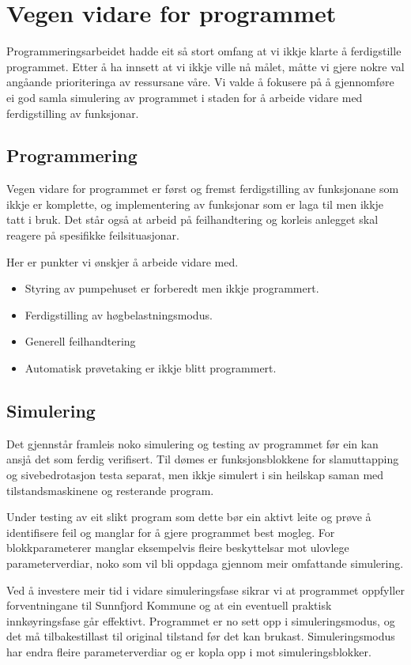 \section{Vegen vidare for programmet}
\thispagestyle{fancy}

Programmeringsarbeidet hadde eit så stort omfang at vi ikkje klarte å ferdigstille programmet.
Etter å ha innsett at vi ikkje ville nå målet, måtte vi gjere nokre val angåande prioriteringa av ressursane våre. 
Vi valde å fokusere på å gjennomføre ei god samla simulering av programmet i staden for å arbeide vidare med ferdigstilling av funksjonar.

\subsection{Programmering}

Vegen vidare for programmet er først og fremst ferdigstilling av funksjonane som ikkje er komplette, og 
implementering av funksjonar som er laga til men ikkje tatt i bruk. 
Det står også at arbeid på feilhandtering og korleis anlegget skal reagere på spesifikke feilsituasjonar.

Her er punkter vi ønskjer å arbeide vidare med.

\begin{itemize}
    \item Styring av pumpehuset er forberedt men ikkje programmert. 
    \item Ferdigstilling av høgbelastningsmodus.
    \item Generell feilhandtering
    \item Automatisk prøvetaking er ikkje blitt programmert.
\end{itemize}

\subsection{Simulering}

Det gjennstår framleis noko simulering og testing av programmet før ein kan ansjå det som ferdig verifisert.
Til dømes er funksjonsblokkene for slamuttapping og sivebedrotasjon testa separat, men ikkje simulert i sin heilskap saman med
tilstandsmaskinene og resterande program.

Under testing av eit slikt program som dette bør ein aktivt leite og prøve å identifisere feil og manglar for å gjere programmet best mogleg.
For blokkparameterer manglar eksempelvis fleire beskyttelsar mot ulovlege parameterverdiar, noko som vil bli oppdaga gjennom meir omfattande simulering.

Ved å investere meir tid i vidare simuleringsfase sikrar vi at programmet oppfyller forventningane til \gls{Sunnfjord Kommune} og at ein eventuell
praktisk innkøyringsfase går effektivt. \newline
Programmet er no sett opp i simuleringsmodus, og det må tilbakestillast til original tilstand før det kan brukast. 
Simuleringsmodus har endra fleire parameterverdiar og er kopla opp i mot simuleringsblokker.  



\newpage